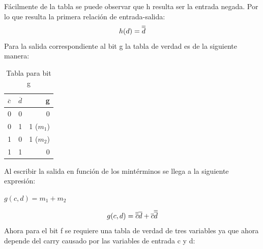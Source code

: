 Fácilmente de la tabla se puede observar que h resulta ser la entrada negada. Por lo que resulta la primera relación de entrada-salida:
\begin{equation}
	\centerline{$h(d)=\overline{\overline{d}}$}
\end{equation}
Para la salida correspondiente al bit g la tabla de verdad es de la siguiente manera:
\begin{table}[h!]
	\begin{center}
		\caption{Tabla para bit g}
		\vspace{5mm}
		\begin{tabular}{l|c|r}
			\textbf{$\overline{c}$} & \textbf{$\overline{d}$} & \textbf{g}  \\
			\hline
			0                       & 0                       & 0           \\
			0                       & 1                       & 1 ($m_{1}$) \\	
			1                       & 0                       & 1 ($m_{2}$) \\
			1                       & 1                       & 0           \\			
		\end{tabular}
	\end{center}
\end{table}	
Al escribir la salida en función de los mintérminos se llega a la siguiente expresión:
\centerline{$g(c,d)=m_{1}+m_{2}$}
\begin{equation}
	\centerline{$g(c,d)=\overline{\overline{c}}\overline{d}+\overline{c}\overline{\overline{d}}$}
\end{equation}
Ahora para el bit f se requiere una tabla de verdad de tres variables ya que ahora depende del carry causado por las variables de entrada c y d:
